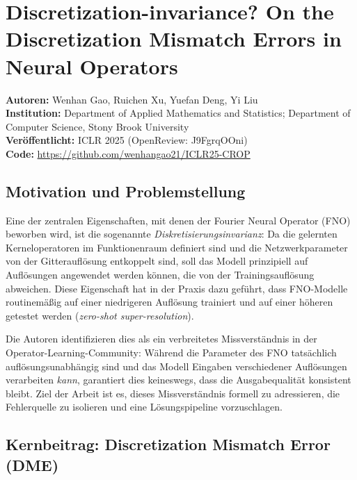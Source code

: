 \documentclass[a4paper,12pt]{article}
\begin{document}
\section*{Discretization-invariance? On the Discretization Mismatch
          Errors in Neural Operators}

\noindent\textbf{Autoren:} Wenhan Gao, Ruichen Xu, Yuefan Deng, Yi Liu\\[2pt]
\textbf{Institution:} Department of Applied Mathematics and Statistics;
Department of Computer Science, Stony Brook University\\[2pt]
\textbf{Ver\"offentlicht:} ICLR 2025 (OpenReview: J9FgrqOOni)\\[2pt]
\textbf{Code:} \url{https://github.com/wenhangao21/ICLR25-CROP}

\subsection*{Motivation und Problemstellung}

Eine der zentralen Eigenschaften, mit denen der Fourier Neural Operator (FNO)
beworben wird, ist die sogenannte \emph{Diskretisierungsinvarianz}: Da die
gelernten Kerneloperatoren im Funktionenraum definiert sind und die Netzwerkparameter von der Gitteraufl\"osung entkoppelt sind, soll das Modell prinzipiell
auf Aufl\"osungen angewendet werden k\"onnen, die von der Trainingsaufl\"osung
abweichen. Diese Eigenschaft hat in der Praxis dazu gef\"uhrt, dass FNO-Modelle
routinem\"a\ss ig auf einer niedrigeren Aufl\"osung trainiert und auf einer
h\"oheren getestet werden (\emph{zero-shot super-resolution}).

Die Autoren identifizieren dies als ein verbreitetes Missverst\"andnis in der
Operator-Learning-Community: W\"ahrend die Parameter des FNO tats\"achlich
aufl\"osungsunabh\"angig sind und das Modell Eingaben verschiedener Aufl\"osungen
verarbeiten \emph{kann}, garantiert dies keineswegs, dass die Ausgabequalit\"at
konsistent bleibt. Ziel der Arbeit ist es, dieses Missverst\"andnis formell
zu adressieren, die Fehlerquelle zu isolieren und eine L\"osungspipeline
vorzuschlagen.

\subsection*{Kernbeitrag: Discretization Mismatch Error (DME)}
\end{document}
